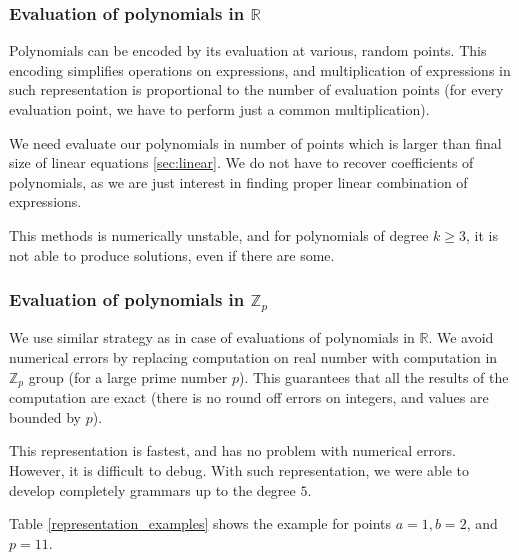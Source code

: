 \subsubsection{Evaluation of polynomials in $\mathbb{R}$}
Polynomials can be encoded by its evaluation at various, random points.
This encoding simplifies operations on expressions, and multiplication of expressions
in such representation is proportional to the number of evaluation points (for every evaluation
point, we have to perform just a common multiplication).

We need evaluate our polynomials in number of points which is larger 
than final size of linear equations \ref{sec:linear}. We do not have to recover coefficients of polynomials,
as we are just interest in finding proper linear combination of expressions.

This methods is numerically unstable, and for polynomials of degree $k \geq 3$, 
it is not able to produce solutions, even if there are some.


\subsubsection{Evaluation of polynomials in $\mathbb{Z}_p$}
We use similar strategy as in case of evaluations of polynomials in $\mathbb{R}$. 
We avoid numerical errors by replacing computation on real number with computation in $\mathbb{Z}_p$ group (for a large prime number $p$). This guarantees that all the results of the computation are exact (there is no round off errors on integers, and values are bounded by $p$). 

This representation is fastest, and has no problem with numerical errors. However, it is difficult to debug. With such representation, we were able to develop completely grammars up to the degree $5$.

Table \ref{representation_examples} shows the example for points $a = 1, b = 2$, and $p = 11$.

